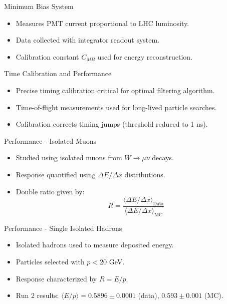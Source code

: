 \documentclass[presentation]{beamer}
\begin{document}
\begin{frame}{Minimum Bias System}
    \begin{itemize}
        \item Measures PMT current proportional to LHC luminosity.
        \item Data collected with integrator readout system.
        \item Calibration constant $C_{MB}$ used for energy reconstruction.
    \end{itemize}
\end{frame}

\begin{frame}{Time Calibration and Performance}
    \begin{itemize}
        \item Precise timing calibration critical for optimal filtering algorithm.
        \item Time-of-flight measurements used for long-lived particle searches.
        \item Calibration corrects timing jumps (threshold reduced to 1 ns).
    \end{itemize}
\end{frame}

\begin{frame}{Performance - Isolated Muons}
    \begin{itemize}
        \item Studied using isolated muons from $W \to \mu \nu$ decays.
        \item Response quantified using $\Delta E / \Delta x$ distributions.
        \item Double ratio given by:
        \begin{equation}
            R = \frac{\langle\Delta E / \Delta x\rangle_{\text{Data}}}{\langle\Delta E / \Delta x\rangle_{\text{MC}}}
        \end{equation}
    \end{itemize}
\end{frame}

\begin{frame}{Performance - Single Isolated Hadrons}
    \begin{itemize}
        \item Isolated hadrons used to measure deposited energy.
        \item Particles selected with $p < 20$ GeV.
        \item Response characterized by $R = E/p$.
        \item Run 2 results: $\langle E/p \rangle = 0.5896 \pm 0.0001$ (data), $0.593 \pm 0.001$ (MC).
    \end{itemize}
\end{frame}
\end{document}
